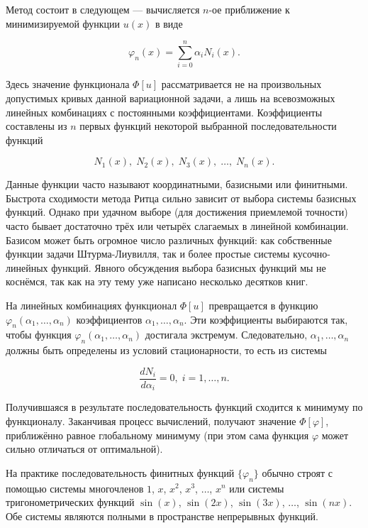 \documentclass{article}
\begin{document}
Метод состоит в следующем --- вычисляется $n$-ое приближение к минимизируемой функции $u(x)$ в виде

\begin{equation}\label{approx_func}
	\varphi_{n}(x) = \sum_{i=0}^n \alpha_{i} N_{i}(x).
\end{equation}

\noindent Здесь значение функционала $\Phi[u]$ рассматривается не на произвольных допустимых кривых данной вариационной задачи, а лишь на всевозможных линейных комбинациях с постоянными коэффициентами. Коэффициенты составлены из $n$ первых функций некоторой выбранной последовательности функций

\begin{displaymath}
	N_{1}(x), \; N_{2}(x), \; N_{3}(x), \; \ldots, \; N_{n}(x).
\end{displaymath}

\begin{info}
	Данные функции часто называют координатными, базисными или финитными. Быстрота сходимости метода Ритца сильно зависит от выбора системы базисных функций. Однако при удачном выборе (для достижения приемлемой точности) часто бывает достаточно трёх или четырёх слагаемых в линейной комбинации. Базисом может быть огромное число различных функций: как собственные функции задачи Штурма-Лиувилля, так и более простые системы кусочно-линейных функций. Явного обсуждения выбора базисных функций мы не коснёмся, так как на эту тему уже написано несколько десятков книг.
\end{info}

На линейных комбинациях функционал $\Phi[u]$ превращается в функцию $\varphi_{n}(\alpha_{1}, \ldots, \alpha_{n})$ коэффициентов $\alpha_{1}, \ldots, \alpha_{n}$. Эти коэффициенты выбираются так, чтобы функция $\varphi_{n}(\alpha_{1}, \ldots, \alpha_{n})$ достигала экстремум. Следовательно, $\alpha_{1}, \ldots, \alpha_{n}$ должны быть определены из условий стационарности, то есть из системы

\begin{displaymath}
	\frac{d N_{i}}{d\alpha_{i}} = 0, \; i = 1, \ldots, n.
\end{displaymath}

Получившаяся в результате последовательность функций сходится к минимуму по функционалу. Заканчивая процесс вычислений, получают значение $\Phi[\varphi]$, приближённо равное глобальному минимуму (при этом сама функция $\varphi$ может сильно отличаться от оптимальной).

На практике последовательность финитных функций ${\lbrace \varphi_{n} \rbrace}$ обычно строят с помощью системы многочленов $1$, $x$, $x^2$, $x^3$, $\ldots$, $x^n$ или системы тригонометрических функций $\sin (x)$, $\sin (2x)$, $\sin (3x)$, $\ldots$, $\sin (nx)$. Обе системы являются полными в пространстве непрерывных функций.
\end{document}
